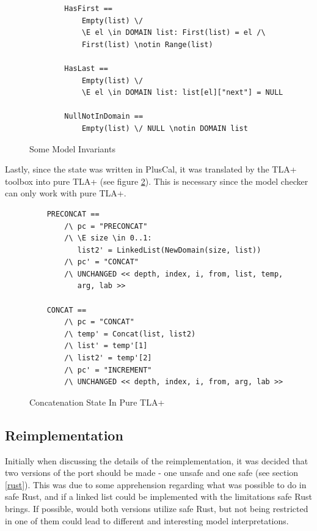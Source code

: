 \begin{figure}[H]
\begin{verbatim}
        HasFirst == 
            Empty(list) \/ 
            \E el \in DOMAIN list: First(list) = el /\ 
            First(list) \notin Range(list)
        
        HasLast == 
            Empty(list) \/ 
            \E el \in DOMAIN list: list[el]["next"] = NULL 
        
        NullNotInDomain == 
            Empty(list) \/ NULL \notin DOMAIN list
\end{verbatim} 

    \caption{Some Model Invariants}
    \label{fig:invariants}
\end{figure}

Lastly, since the state was written in PlusCal, it was translated by the TLA+ toolbox into pure TLA+ (see figure \ref{fig:puretla}). This is necessary since the model checker can only work with pure TLA+.

\begin{figure}[H]
 \vspace{12pt}
\begin{verbatim}
    PRECONCAT == 
        /\ pc = "PRECONCAT"
        /\ \E size \in 0..1:
           list2' = LinkedList(NewDomain(size, list))
        /\ pc' = "CONCAT"
        /\ UNCHANGED << depth, index, i, from, list, temp,
           arg, lab >>
    
    CONCAT == 
        /\ pc = "CONCAT"
        /\ temp' = Concat(list, list2)
        /\ list' = temp'[1]
        /\ list2' = temp'[2]
        /\ pc' = "INCREMENT"
        /\ UNCHANGED << depth, index, i, from, arg, lab >>
\end{verbatim} 
    \caption{Concatenation State In Pure TLA+}
    \label{fig:puretla}
\end{figure}


\subsection{Reimplementation}

Initially when discussing the details of the reimplementation, it was decided that two versions of the port should be made - one unsafe and one safe (see section \ref{rust}). This was due to some apprehension regarding what was possible to do in safe Rust, and if a linked list could be implemented with the limitations safe Rust brings. If possible, would both versions utilize safe Rust, but not being restricted in one of them could lead to different and interesting model interpretations. 

